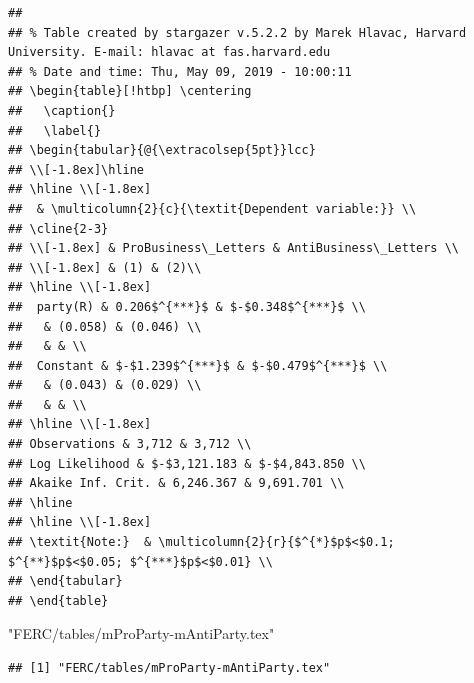 \documentclass[]{article}
\newenvironment{Shaded}{\begin{snugshade}}{\end{snugshade}}
\newcommand{\StringTok}[1]{\textcolor[rgb]{0.31,0.60,0.02}{#1}}
\begin{document}
\begin{verbatim}
## 
## % Table created by stargazer v.5.2.2 by Marek Hlavac, Harvard University. E-mail: hlavac at fas.harvard.edu
## % Date and time: Thu, May 09, 2019 - 10:00:11
## \begin{table}[!htbp] \centering 
##   \caption{} 
##   \label{} 
## \begin{tabular}{@{\extracolsep{5pt}}lcc} 
## \\[-1.8ex]\hline 
## \hline \\[-1.8ex] 
##  & \multicolumn{2}{c}{\textit{Dependent variable:}} \\ 
## \cline{2-3} 
## \\[-1.8ex] & ProBusiness\_Letters & AntiBusiness\_Letters \\ 
## \\[-1.8ex] & (1) & (2)\\ 
## \hline \\[-1.8ex] 
##  party(R) & 0.206$^{***}$ & $-$0.348$^{***}$ \\ 
##   & (0.058) & (0.046) \\ 
##   & & \\ 
##  Constant & $-$1.239$^{***}$ & $-$0.479$^{***}$ \\ 
##   & (0.043) & (0.029) \\ 
##   & & \\ 
## \hline \\[-1.8ex] 
## Observations & 3,712 & 3,712 \\ 
## Log Likelihood & $-$3,121.183 & $-$4,843.850 \\ 
## Akaike Inf. Crit. & 6,246.367 & 9,691.701 \\ 
## \hline 
## \hline \\[-1.8ex] 
## \textit{Note:}  & \multicolumn{2}{r}{$^{*}$p$<$0.1; $^{**}$p$<$0.05; $^{***}$p$<$0.01} \\ 
## \end{tabular} 
## \end{table}
\end{verbatim}

\begin{Shaded}
\begin{Highlighting}[]
\StringTok{"FERC/tables/mProParty-mAntiParty.tex"}
\end{Highlighting}
\end{Shaded}

\begin{verbatim}
## [1] "FERC/tables/mProParty-mAntiParty.tex"
\end{verbatim}
\end{document}
